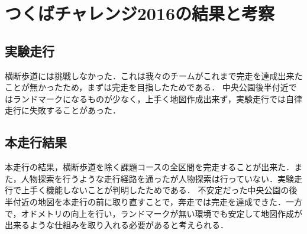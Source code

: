\documentclass[10pt,a4paper]{jarticle}
\begin{document}
\section{つくばチャレンジ2016の結果と考察}
\subsection{実験走行}
横断歩道には挑戦しなかった．これは我々のチームがこれまで完走を達成出来たことが無かったため，まずは完走を目指したためである．
中央公園後半付近ではランドマークになるものが少なく，上手く地図作成出来ず，実験走行では自律走行に失敗することがあった．

\subsection{本走行結果}
本走行の結果，横断歩道を除く課題コースの全区間を完走することが出来た．また，人物探索を行うような走行経路を通ったが人物探索は行っていない．実験走行で上手く機能しないことが判明したためである．
不安定だった中央公園の後半付近の地図を本走行の前に取り直すことで，奔走では完走を達成できた．一方で，オドメトリの向上を行い，ランドマークが無い環境でも安定して地図作成が出来るような仕組みを取り入れる必要があると考えられる．
\end{document}
